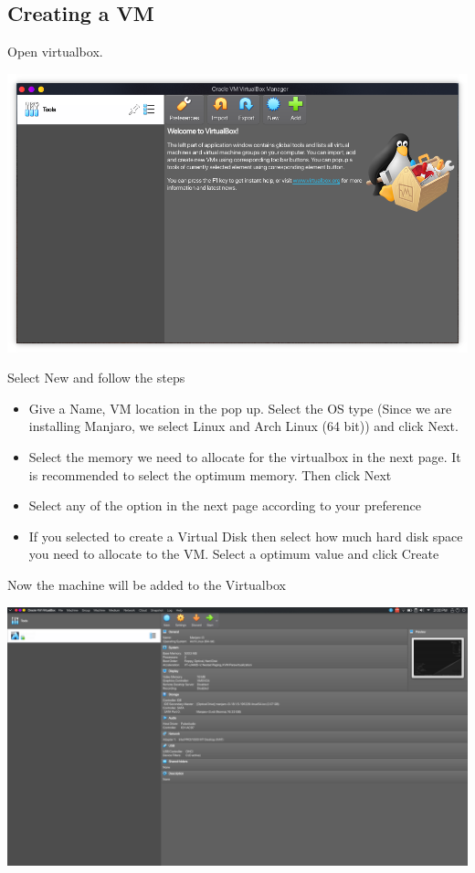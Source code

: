 \documentclass{article}
\begin{document}
\newpage

\subsection{Creating a VM}
Open virtualbox.
\newline\newline

\includegraphics[width=1.2\textwidth]{img/p26/ss1.png}

Select New and follow the steps
\begin{itemize}
	\item Give a Name, VM location in the pop up. Select the OS type (Since we are installing
	Manjaro, we select Linux and Arch Linux (64 bit)) and click Next.
	\item Select the memory we need to allocate for the virtualbox in the next page. It is 
	recommended to select the optimum memory. Then click Next
	\item Select any of the option in the next page according to your preference
	\item If you selected to create a Virtual Disk then select how much hard disk space you
	need to allocate to the VM. Select a optimum value and click Create
\end{itemize}
Now the machine will be added to the Virtualbox
\newline\newline

\includegraphics[width=1.2\textwidth]{img/p26/ss2.png}
\end{document}
